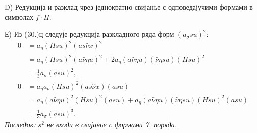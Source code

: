 ﻿\documentclass[11pt]{article}
\begin{document}
D) Редукција и разклад чрез једнократно свијанье с одповедајучими формами в символах $f\cdot H$.

Е) Из (30.)ц следује редукција разкладного ряда форм $(a_\sigma su)^2$:
\[
\begin{aligned}
0&=a_\eta(Hsu)^2(as\widehat{\nu}x)^2\\
&=a_\eta(Hsu)^2(a\widehat{\nu}\eta u)^2
  +2a_\eta(a\widehat{\nu}\eta u)(\widehat{\nu}\eta su)(Hsu)^2\\
&=\frac13a_\sigma(asu)^2,\\
0&=a_\eta a_{\nu}(Hsu)^2(as\widehat{\nu}x)(asu)\\
&=a_\eta(a\widehat{\nu}\eta u)^2(Hsu)^2(asu)
  +a_\eta(a\widehat{\nu}\eta u)(\widehat{\nu}\eta su)(Hsu)^2(asu)\\
&=\frac13a_\sigma(asu)^3.
\end{aligned}
\]
\noindent\textit{Последок: $s^2$ не входи в свијанье с формами 7. поряда.}
\end{document}
